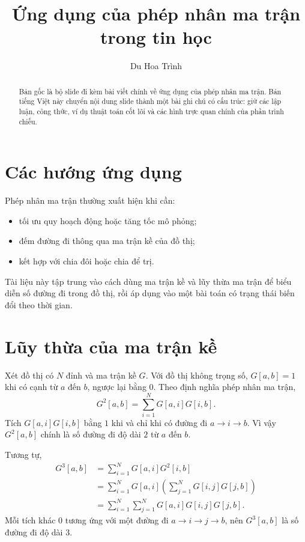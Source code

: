 \documentclass[11pt]{article}
\title{Ứng dụng của phép nhân ma trận trong tin học}
\author{Du Hoa Trình}
\date{}
\begin{document}
\maketitle
{}

\begin{abstract}
Bản gốc là bộ slide đi kèm bài viết chính về ứng dụng của phép nhân ma trận.
Bản tiếng Việt này chuyển nội dung slide thành một bài ghi chú có cấu trúc:
giữ các lập luận, công thức, ví dụ thuật toán cốt lõi và các hình trực quan
chính của phần trình chiếu.
\end{abstract}

\section{Các hướng ứng dụng}

Phép nhân ma trận thường xuất hiện khi cần:
\begin{itemize}
  \item tối ưu quy hoạch động hoặc tăng tốc mô phỏng;
  \item đếm đường đi thông qua ma trận kề của đồ thị;
  \item kết hợp với chia đôi hoặc chia để trị.
\end{itemize}

Tài liệu này tập trung vào cách dùng ma trận kề và lũy thừa ma trận để
biểu diễn số đường đi trong đồ thị, rồi áp dụng vào một bài toán có
trạng thái biến đổi theo thời gian.

\section{Lũy thừa của ma trận kề}

Xét đồ thị có $N$ đỉnh và ma trận kề $G$. Với đồ thị không trọng số,
$G[a,b]=1$ khi có cạnh từ $a$ đến $b$, ngược lại bằng $0$. Theo định
nghĩa phép nhân ma trận,
\[
  G^2[a,b]=\sum_{i=1}^{N}G[a,i]G[i,b].
\]
Tích $G[a,i]G[i,b]$ bằng $1$ khi và chỉ khi có đường đi
$a\to i\to b$. Vì vậy $G^2[a,b]$ chính là số đường đi độ dài $2$ từ
$a$ đến $b$.

Tương tự,
\[
\begin{aligned}
G^3[a,b]
  &=\sum_{i=1}^{N}G[a,i]G^2[i,b] \\
  &=\sum_{i=1}^{N}G[a,i]\left(\sum_{j=1}^{N}G[i,j]G[j,b]\right) \\
  &=\sum_{i=1}^{N}\sum_{j=1}^{N}G[a,i]G[i,j]G[j,b].
\end{aligned}
\]
Mỗi tích khác $0$ tương ứng với một đường đi
$a\to i\to j\to b$, nên $G^3[a,b]$ là số đường đi độ dài $3$.
\end{document}
